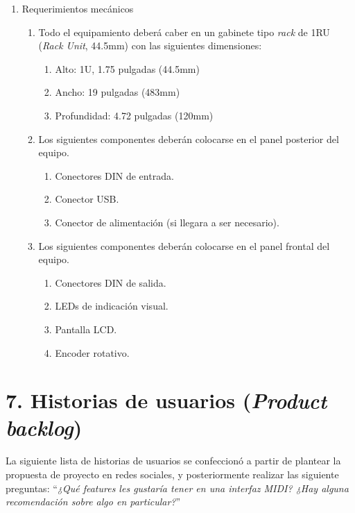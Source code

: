 \documentclass[
11pt, %
]{charter}
\begin{document}
\begin{enumerate}
	\item Requerimientos mecánicos
	\begin{enumerate}
		\item Todo el equipamiento deberá caber en un gabinete tipo \emph{rack} de 1RU (\emph{Rack Unit}, 44.5mm) con las siguientes dimensiones:
		\begin{enumerate}
			\item Alto: 1U, 1.75 pulgadas (44.5mm)
			\item Ancho: 19 pulgadas (483mm)
			\item Profundidad: 4.72 pulgadas (120mm)
		\end{enumerate}
		\item Los siguientes componentes deberán colocarse en el panel posterior del equipo.
		\begin{enumerate}
			\item Conectores DIN de entrada.
			\item Conector USB.
			\item Conector de alimentación (si llegara a ser necesario).
		\end{enumerate}
		\item Los siguientes componentes deberán colocarse en el panel frontal del equipo.
		\begin{enumerate}
			\item Conectores DIN de salida.
			\item LEDs de indicación visual.
			\item Pantalla LCD.
			\item Encoder rotativo.
		\end{enumerate}
	\end{enumerate}
\end{enumerate}

\section{7. Historias de usuarios (\textit{Product backlog})}
\label{sec:backlog}

La siguiente lista de historias de usuarios se confeccionó a partir de plantear la propuesta de proyecto en redes sociales, y posteriormente realizar las siguiente preguntas:
``\emph{¿Qué features les gustaría tener en una interfaz MIDI? ¿Hay alguna recomendación sobre algo en particular?}''
\end{document}
